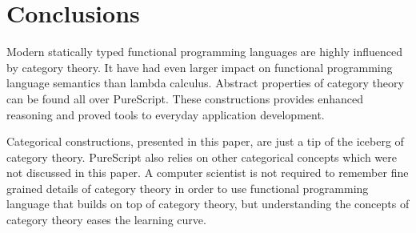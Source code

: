 \documentclass[article]{aaltoseries}
\begin{document}
\section{Conclusions}

Modern statically typed functional programming languages are highly influenced
by category theory. It have had even larger impact on functional programming
language semantics than lambda calculus. Abstract properties of category theory
can be found all over PureScript. These constructions provides enhanced
reasoning and proved tools to everyday application development.
 
Categorical constructions, presented in this paper, are just a tip of the
iceberg of category theory. PureScript also relies on other categorical concepts
which were not discussed in this paper. A computer scientist is not required to
remember fine grained details of category theory in order to use functional
programming language that builds on top of category theory, but understanding
the concepts of category theory eases the learning curve.




\end{document}
